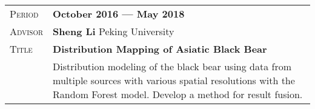 
\vspace{12pt}

\begin{tabularx}{0.97\linewidth}{>{\raggedleft\scshape}p{2cm}X}
 Period & \textbf{October 2016 --- May 2018}\\
 Advisor & \textbf{Sheng Li} \hfill Peking University\\
 Title & \textbf{Distribution Mapping of Asiatic Black Bear}\\
& Distribution modeling of the black bear using data from multiple sources with various spatial resolutions with the Random Forest model. Develop a method for result fusion.
\end{tabularx}
